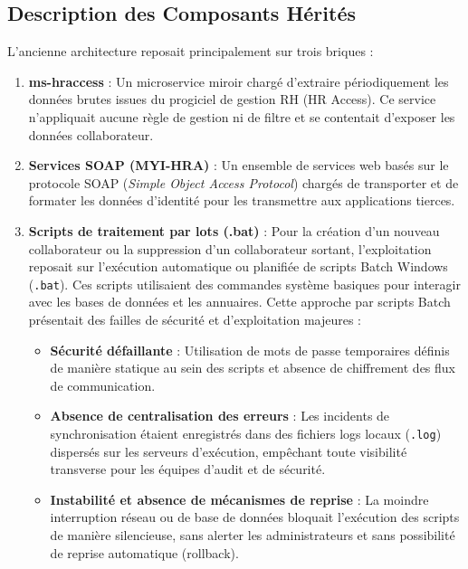 \subsection{Description des Composants Hérités}
L'ancienne architecture reposait principalement sur trois briques :
\begin{enumerate}
    \item \textbf{ms-hraccess} : Un microservice miroir chargé d'extraire périodiquement les données brutes issues du progiciel de gestion RH (HR Access). Ce service n'appliquait aucune règle de gestion ni de filtre et se contentait d'exposer les données collaborateur.
    \item \textbf{Services SOAP (MYI-HRA)} : Un ensemble de services web basés sur le protocole SOAP (\textit{Simple Object Access Protocol}) chargés de transporter et de formater les données d'identité pour les transmettre aux applications tierces.
    \item \textbf{Scripts de traitement par lots (.bat)} : Pour la création d'un nouveau collaborateur ou la suppression d'un collaborateur sortant, l'exploitation reposait sur l'exécution automatique ou planifiée de scripts Batch Windows (\texttt{.bat}). Ces scripts utilisaient des commandes système basiques pour interagir avec les bases de données et les annuaires. Cette approche par scripts Batch présentait des failles de sécurité et d'exploitation majeures :
\begin{itemize}
    \item \textbf{Sécurité défaillante} : Utilisation de mots de passe temporaires définis de manière statique au sein des scripts et absence de chiffrement des flux de communication.
    \item \textbf{Absence de centralisation des erreurs} : Les incidents de synchronisation étaient enregistrés dans des fichiers logs locaux (\texttt{.log}) dispersés sur les serveurs d'exécution, empêchant toute visibilité transverse pour les équipes d'audit et de sécurité.
    \item \textbf{Instabilité et absence de mécanismes de reprise} : La moindre interruption réseau ou de base de données bloquait l'exécution des scripts de manière silencieuse, sans alerter les administrateurs et sans possibilité de reprise automatique (rollback).
\end{itemize}
\end{enumerate}

